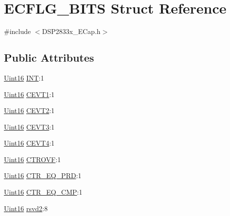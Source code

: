 \hypertarget{struct_e_c_f_l_g___b_i_t_s}{}\section{E\+C\+F\+L\+G\+\_\+\+B\+I\+T\+S Struct Reference}
\label{struct_e_c_f_l_g___b_i_t_s}


{\ttfamily \#include $<$D\+S\+P2833x\+\_\+\+E\+Cap.\+h$>$}

\subsection*{Public Attributes}
\begin{DoxyCompactItemize}
\item 
\hyperlink{_d_s_p2833x___device_8h_a59a9f6be4562c327cbfb4f7e8e18f08b}{Uint16} \hyperlink{struct_e_c_f_l_g___b_i_t_s_ab6f86fdb07a28c59d8cab3000aeaa971}{I\+N\+T}\+:1
\item 
\hyperlink{_d_s_p2833x___device_8h_a59a9f6be4562c327cbfb4f7e8e18f08b}{Uint16} \hyperlink{struct_e_c_f_l_g___b_i_t_s_a393e73a8458e1e612f02b139983f3592}{C\+E\+V\+T1}\+:1
\item 
\hyperlink{_d_s_p2833x___device_8h_a59a9f6be4562c327cbfb4f7e8e18f08b}{Uint16} \hyperlink{struct_e_c_f_l_g___b_i_t_s_ad29b523dc5a22b99deb6a40959855bde}{C\+E\+V\+T2}\+:1
\item 
\hyperlink{_d_s_p2833x___device_8h_a59a9f6be4562c327cbfb4f7e8e18f08b}{Uint16} \hyperlink{struct_e_c_f_l_g___b_i_t_s_a7ec3741636c80d563584414af6fe8df7}{C\+E\+V\+T3}\+:1
\item 
\hyperlink{_d_s_p2833x___device_8h_a59a9f6be4562c327cbfb4f7e8e18f08b}{Uint16} \hyperlink{struct_e_c_f_l_g___b_i_t_s_a5e349199201609c7cd0cb748dd182cb2}{C\+E\+V\+T4}\+:1
\item 
\hyperlink{_d_s_p2833x___device_8h_a59a9f6be4562c327cbfb4f7e8e18f08b}{Uint16} \hyperlink{struct_e_c_f_l_g___b_i_t_s_ab1417dade7485b40d47bb64b5b3eef81}{C\+T\+R\+O\+V\+F}\+:1
\item 
\hyperlink{_d_s_p2833x___device_8h_a59a9f6be4562c327cbfb4f7e8e18f08b}{Uint16} \hyperlink{struct_e_c_f_l_g___b_i_t_s_a664ef83feafe31149ab2f19312f017b0}{C\+T\+R\+\_\+\+E\+Q\+\_\+\+P\+R\+D}\+:1
\item 
\hyperlink{_d_s_p2833x___device_8h_a59a9f6be4562c327cbfb4f7e8e18f08b}{Uint16} \hyperlink{struct_e_c_f_l_g___b_i_t_s_a8a5ffee9e2323a54c5273ca529f4310f}{C\+T\+R\+\_\+\+E\+Q\+\_\+\+C\+M\+P}\+:1
\item 
\hyperlink{_d_s_p2833x___device_8h_a59a9f6be4562c327cbfb4f7e8e18f08b}{Uint16} \hyperlink{struct_e_c_f_l_g___b_i_t_s_a37e13d634434a5accdf84ff95b5acc6e}{rsvd2}\+:8
\end{DoxyCompactItemize}


